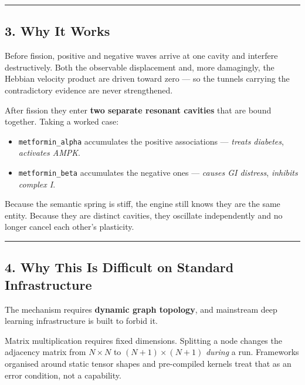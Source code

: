 \documentclass[
  11pt,
  a4paper,
]{article}
\providecommand{\tightlist}{%
  \setlength{\itemsep}{0pt}\setlength{\parskip}{0pt}}
\begin{document}
\begin{center}\rule{0.5\linewidth}{0.5pt}\end{center}

\subsection{3. Why It Works}\label{why-it-works}

Before fission, positive and negative waves arrive at one cavity and
interfere destructively. Both the observable displacement and, more
damagingly, the Hebbian velocity product are driven toward zero --- so
the tunnels carrying the contradictory evidence are never strengthened.

After fission they enter \textbf{two separate resonant cavities} that
are bound together. Taking a worked case:

\begin{itemize}
\tightlist
\item
  \texttt{metformin\_alpha} accumulates the positive associations ---
  \emph{treats diabetes}, \emph{activates AMPK}.
\item
  \texttt{metformin\_beta} accumulates the negative ones ---
  \emph{causes GI distress}, \emph{inhibits complex I}.
\end{itemize}

Because the semantic spring is stiff, the engine still knows they are
the same entity. Because they are distinct cavities, they oscillate
independently and no longer cancel each other's plasticity.

\begin{center}\rule{0.5\linewidth}{0.5pt}\end{center}

\subsection{4. Why This Is Difficult on Standard
Infrastructure}\label{why-this-is-difficult-on-standard-infrastructure}

The mechanism requires \textbf{dynamic graph topology}, and mainstream
deep learning infrastructure is built to forbid it.

Matrix multiplication requires fixed dimensions. Splitting a node
changes the adjacency matrix from \(N \times N\) to
\((N{+}1) \times (N{+}1)\) \emph{during} a run. Frameworks organised
around static tensor shapes and pre-compiled kernels treat that as an
error condition, not a capability.
\end{document}
